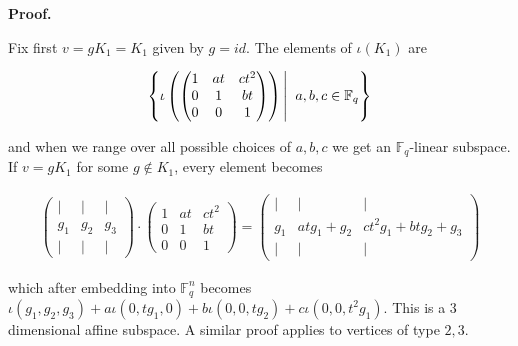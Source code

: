 \documentclass[10pt,a4paper]{article}
\begin{document}



\par\medskip\noindent\textbf{Proof.}\par




Fix first $v=gK_{1}=K_{1}$ given by $g=id$. The elements of $\iota(K_{1})$ are\par


\[\begin{gathered}
\left\{\iota\left(\begin{pmatrix}1&at&ct^{2}\\
0&1&bt\\
0&0&1\end{pmatrix}\right)\left|\;\vphantom{\iota\left(\begin{pmatrix}1&at&ct^{2}\\
0&1&bt\\
0&0&1\end{pmatrix}\right)a,b,c\in\mathbb{F}_{q}}\right.a,b,c\in\mathbb{F}_{q}\right\}
\end{gathered}\]


and when we range over all possible choices of $a,b,c$ we get an $\mathbb{F}_{q}$-linear subspace. If $v=gK_{1}$ for some $g\not\in K_{1}$, every element becomes\par


\[\begin{gathered}
\begin{pmatrix}|&|&|\\
g_{1}&g_{2}&g_{3}\\
|&|&|\end{pmatrix}\cdot\begin{pmatrix}1&at&ct^{2}\\
0&1&bt\\
0&0&1\end{pmatrix}=\begin{pmatrix}|&|&|\\
g_{1}&atg_{1}+g_{2}&ct^{2}g_{1}+btg_{2}+g_{3}\\
|&|&|\end{pmatrix}
\end{gathered}\]


which after embedding into $\mathbb{F}_{q}^{n}$ becomes $\iota(g_{1},g_{2},g_{3})+a\iota(0,tg_{1},0)+b\iota(0,0,tg_{2})+c\iota(0,0,t^{2}g_{1})$. This is a $3$ dimensional affine subspace.
A similar proof applies to vertices of type $2,3$.\par
\end{document}
